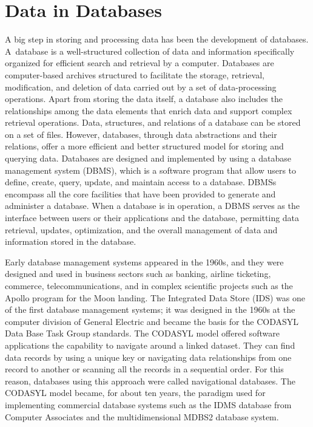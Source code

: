 \section{\label{sec:3.3}Data in Databases}

A big step in storing and
processing data has been the development of databases. A~database is a well-structured collection of data and information specifically organized for efficient search and retrieval by a computer. Databases are computer-based archives structured to facilitate the storage, retrieval, modification, and deletion of data carried out by a set of data-processing operations. Apart from storing the data itself, a database also includes the relationships among the data elements that enrich data and support complex retrieval operations. Data, structures, and relations of a database can be stored on a set of files. However, databases, through data abstractions and their relations, offer a more efficient and better structured model for storing and querying data. Databases are designed and implemented by using a database management system (DBMS), which is a software program that allow users to define, create, query, update, and maintain access to a database. DBMSs encompass all the core facilities that have been provided to generate and administer a database. When a database is in operation, a DBMS serves as the interface between users or their applications and the database, permitting data retrieval, updates, optimization, and the overall management of data and information stored in the database.

Early database management systems appeared in the 1960s, and they were designed and used in business sectors such as banking, airline ticketing, commerce, telecommunications, and in complex scientific projects such as the Apollo program for the Moon landing. The Integrated Data Store (IDS) was one of the first database management systems; it was designed in the 1960s at the computer division of General Electric and became the basis for the CODASYL Data Base Task Group standards. The CODASYL model offered software applications the capability to navigate around a linked dataset. They can find data records by using a unique key or navigating data relationships from one record to another or scanning all the records in a sequential order. For this reason, databases using this approach were called navigational databases. The CODASYL model became, for about ten years, the paradigm used for implementing commercial database systems such as the IDMS database from Computer Associates and the multidimensional MDBS2 database system.

